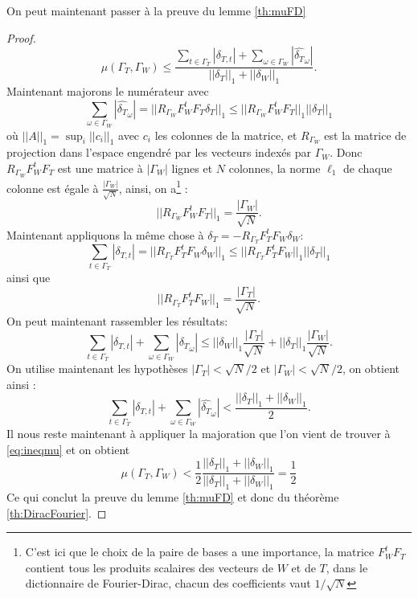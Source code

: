	On peut maintenant passer à la preuve du lemme \ref{th:muFD}
	\begin{proof}
		\begin{equation}\label{eq:ineqmu}
			\mu(\Gamma_T, \Gamma_W) \leq \frac{\sum_{t \in \Gamma_T} |\delta_{T, t}| + \sum_{\omega \in \Gamma_W} |\widehat{\delta_{T}}_\omega|}{||\delta_T||_1 + ||\delta_W||_1}. 
		\end{equation}
		Maintenant majorons le numérateur avec 
		\begin{equation}\label{eq:ineqnum}
			\sum_{\omega \in \Gamma_W} |\widehat{\delta_T}_\omega| = ||R_{\Gamma_W} F_W^t F_T \delta_T||_1 \leq ||R_{\Gamma_W} F_W^t F_T ||_1 ||\delta_T||_1 
		\end{equation}
		où $||A||_1 = \sup_i ||c_i||_1$ avec $c_i$ les colonnes de la matrice, et $R_{\Gamma_W}$ est la matrice de projection dans l'espace engendré par les vecteurs indexés par $\Gamma_W$.
		Donc $R_{\Gamma_W} F_W^t F_T$ est une matrice à $|\Gamma_W|$ lignes et $N$ colonnes, la norme $\ell_1$ de chaque colonne est égale à $\frac{|\Gamma_W|}{\sqrt{N}}$, ainsi, on a\footnote{C'est ici que le choix de la paire de bases a une importance, la matrice $F_W^t F_T$ contient tous les produits scalaires des vecteurs de $W$ et de $T$, dans le dictionnaire de Fourier-Dirac, chacun des coefficients vaut $1/\sqrt{N}$} :
		\begin{equation}\label{eq:ineqdelta1}
			||R_{\Gamma_W} F_W^t F_T||_1 = \frac{|\Gamma_W|}{\sqrt{N}}.
		\end{equation}	
			Maintenant appliquons la même chose à $\delta_T = -R_{\Gamma_T}F_T^tF_W \delta_W$:
			\begin{equation}
				\sum_{t \in \Gamma_T} |\delta_{T,t}| = ||R_{\Gamma_T} F_T^t F_W \delta_W||_1 \leq ||R_{\Gamma_T} F_T^t F_W ||_1 ||\delta_T||_1 
			\end{equation}
		ainsi que
		\begin{equation}
			||R_{\Gamma_T} F_T^t F_W||_1 = \frac{|\Gamma_T|}{\sqrt{N}}.
		\end{equation}
		On peut maintenant rassembler les résultats:
		\begin{equation}
			\sum_{t \in \Gamma_T} |\delta_{T, t}| + \sum_{\omega \in \Gamma_W} |\widehat{\delta_T}_\omega| 
			\leq ||\delta_{W}||_1 \frac{|\Gamma_T|}{\sqrt{N}} + ||\delta_{T}||_1 \frac{|\Gamma_W|}{\sqrt{N}}. 
		\end{equation}
			On utilise maintenant les hypothèses $|\Gamma_T| < \sqrt{N}/2$ et $|\Gamma_W| < \sqrt{N}/2$, on obtient ainsi :
		\begin{equation}
			\sum_{t \in \Gamma_T} |\delta_{T, t}| + \sum_{\omega \in \Gamma_W} |\widehat{\delta_T}_\omega| 
			< \frac{||\delta_{T}||_1 + ||\delta_{W}||_1 }{2}.
		\end{equation}
			Il nous reste maintenant à appliquer la majoration que l'on vient de trouver à \ref{eq:ineqmu} et on obtient
		\begin{equation}
			\mu(\Gamma_T, \Gamma_W) < \frac{1}{2} \frac{||\delta_T||_1 + ||\delta_W||_1}{||\delta_T||_1 + ||\delta_W||_1} = \frac{1}{2} 
		\end{equation}
			Ce qui conclut la preuve du lemme \ref{th:muFD} et donc du théorème \ref{th:DiracFourier}.
	\end{proof}


